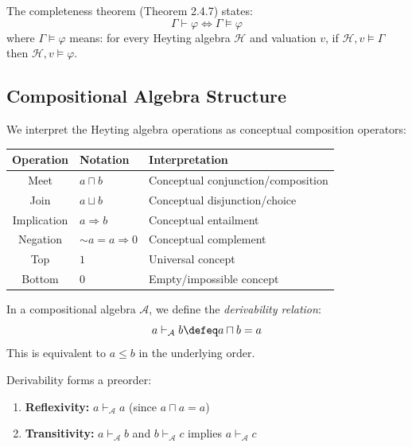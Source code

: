 \documentclass{itt-lean}
\begin{document}
\begin{teorema}
	The completeness theorem (Theorem 2.4.7) states:
	$$
	\Gamma \vdash \varphi \iff \Gamma \models \varphi
	$$
	where $\Gamma \models \varphi$ means: for every Heyting algebra $\mathcal{H}$ and valuation $v$, if $\mathcal{H}, v \models \Gamma$ then $\mathcal{H}, v \models \varphi$.
\end{teorema}

\subsection{Compositional Algebra Structure}

We interpret the Heyting algebra operations as conceptual composition operators:

\begin{center}
	\begin{tabular}{cll}
		\textbf{Operation} & \textbf{Notation} & \textbf{Interpretation} \\
		\hline
		Meet & $a \sqcap b$ & Conceptual conjunction/composition \\
		Join & $a \sqcup b$ & Conceptual disjunction/choice \\
		Implication & $a \Rightarrow b$ & Conceptual entailment \\
		Negation & $\sim a = a \Rightarrow 0$ & Conceptual complement \\
		Top & $1$ & Universal concept \\
		Bottom & $0$ & Empty/impossible concept \\
	\end{tabular}
\end{center}

\begin{definicao}[Derivability]
	In a compositional algebra $\mathcal{A}$, we define the \emph{derivability relation}:
	$$
	a \vdash_{\mathcal{A}} b \defeq a \sqcap b = a
	$$
	This is equivalent to $a \leq b$ in the underlying order.
\end{definicao}

\begin{proposicao}
	Derivability forms a preorder:
	\begin{enumerate}
		\item \textbf{Reflexivity:} $a \vdash_{\mathcal{A}} a$ (since $a \sqcap a = a$)
		\item \textbf{Transitivity:} $a \vdash_{\mathcal{A}} b$ and $b \vdash_{\mathcal{A}} c$ implies $a \vdash_{\mathcal{A}} c$
	\end{enumerate}
\end{proposicao}
\end{document}
